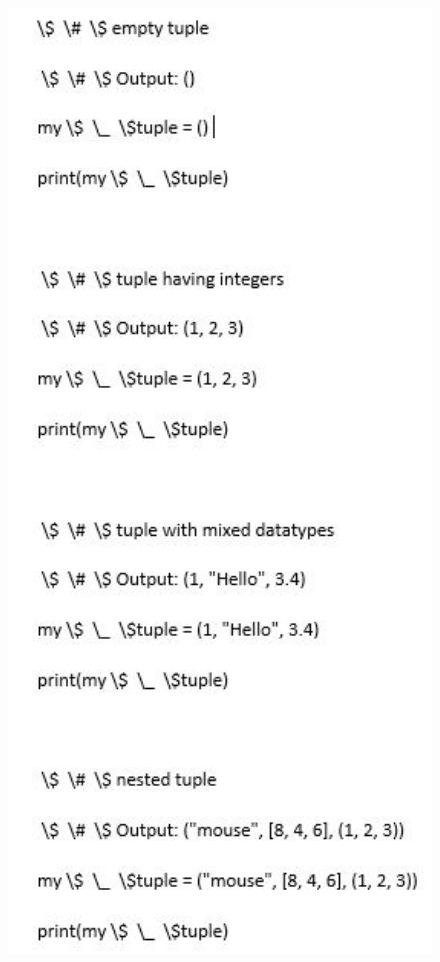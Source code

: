 \begin{figure}[ht]
			\centerline{\includegraphics[width=1\textwidth]{figures/3afs1.JPG}}
			\caption{}
			\label{3afs1}
			\end{figure}
   
